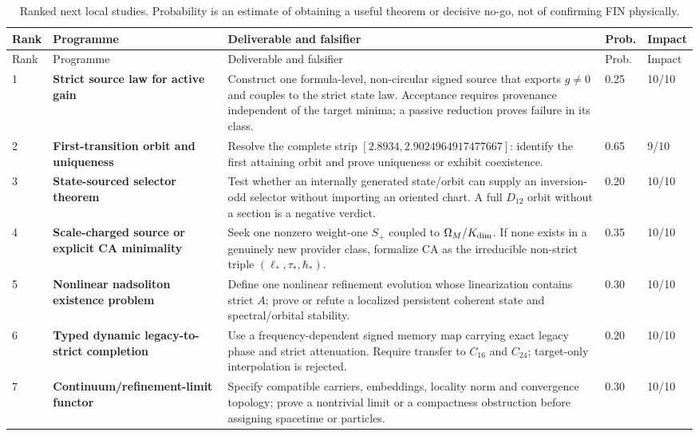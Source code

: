 \documentclass[11pt,a4paper]{article}
\theoremstyle{definition}
\theoremstyle{remark}
\begin{document}
\small
\begin{longtable}{@{}p{}p{}p{}p{}p{}@{}}
\caption{Ranked next local studies. Probability is an estimate of obtaining a useful theorem or decisive no-go, not of confirming FIN physically.}\\
\toprule
Rank & Programme & Deliverable and falsifier & Prob. & Impact\\
\midrule
\endfirsthead
\toprule
Rank & Programme & Deliverable and falsifier & Prob. & Impact\\
\midrule
\endhead
1 & \textbf{Strict source law for active gain} & Construct one formula-level, non-circular signed source that exports $g\ne0$ and couples to the strict state law. Acceptance requires provenance independent of the target minima; a passive reduction proves failure in its class. & 0.25 & 10/10\\
2 & \textbf{First-transition orbit and uniqueness} & Resolve the complete strip $[2.8934,2.9024964917477667]$: identify the first attaining orbit and prove uniqueness or exhibit coexistence. & 0.65 & 9/10\\
3 & \textbf{State-sourced selector theorem} & Test whether an internally generated state/orbit can supply an inversion-odd selector without importing an oriented chart. A full $D_{12}$ orbit without a section is a negative verdict. & 0.20 & 10/10\\
4 & \textbf{Scale-charged source or explicit CA minimality} & Seek one nonzero weight-one $S_+$ coupled to $\Omega_M/K_{\rm dim}$. If none exists in a genuinely new provider class, formalize CA as the irreducible non-strict triple $(\ell_*,\tau_*,\hbar_*)$. & 0.35 & 10/10\\
5 & \textbf{Nonlinear nadsoliton existence problem} & Define one nonlinear refinement evolution whose linearization contains strict $A$; prove or refute a localized persistent coherent state and spectral/orbital stability. & 0.30 & 10/10\\
6 & \textbf{Typed dynamic legacy-to-strict completion} & Use a frequency-dependent signed memory map carrying exact legacy phase and strict attenuation. Require transfer to $C_{16}$ and $C_{24}$; target-only interpolation is rejected. & 0.20 & 10/10\\
7 & \textbf{Continuum/refinement-limit functor} & Specify compatible carriers, embeddings, locality norm and convergence topology; prove a nontrivial limit or a compactness obstruction before assigning spacetime or particles. & 0.30 & 10/10\\

\end{longtable}
\end{document}
